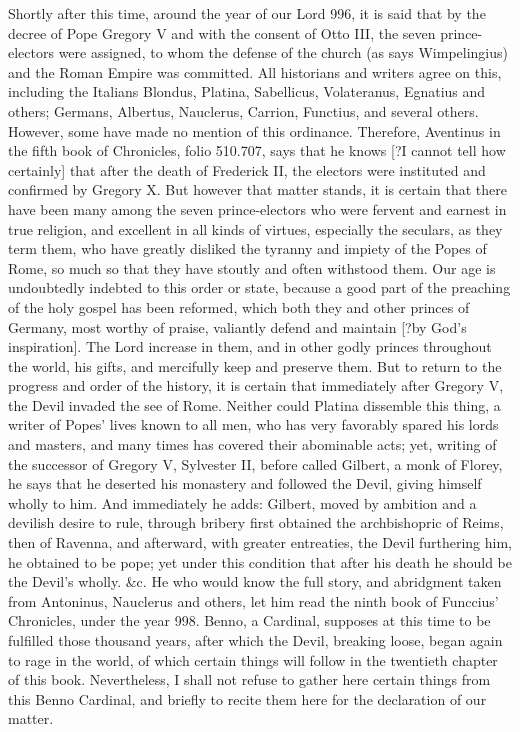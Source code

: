 Shortly after this time, around the year of our Lord 996, it is said that by the decree of Pope Gregory V and with the consent of Otto III, the seven prince-electors were assigned, to whom the defense of the church (as says Wimpelingius) and the Roman Empire was committed. All historians and writers agree on this, including the Italians Blondus, Platina, Sabellicus, Volateranus, Egnatius and others; Germans, Albertus, Nauclerus, Carrion, Functius, and several others. However, some have made no mention of this ordinance. Therefore, Aventinus in the fifth book of Chronicles, folio 510.707, says that he knows [?I cannot tell how certainly] that after the death of Frederick II, the electors were instituted and confirmed by Gregory X. But however that matter stands, it is certain that there have been many among the seven prince-electors who were fervent and earnest in true religion, and excellent in all kinds of virtues, especially the seculars, as they term them, who have greatly disliked the tyranny and impiety of the Popes of Rome, so much so that they have stoutly and often withstood them. Our age is undoubtedly indebted to this order or state, because a good part of the preaching of the holy gospel has been reformed, which both they and other princes of Germany, most worthy of praise, valiantly defend and maintain [?by God’s inspiration]. The Lord increase in them, and in other godly princes throughout the world, his gifts, and mercifully keep and preserve them. But to return to the progress and order of the history, it is certain that immediately after Gregory V, the Devil invaded the see of Rome. Neither could Platina dissemble this thing, a writer of Popes’ lives known to all men, who has very favorably spared his lords and masters, and many times has covered their abominable acts; yet, writing of the successor of Gregory V, Sylvester II, before called Gilbert, a monk of Florey, he says that he deserted his monastery and followed the Devil, giving himself wholly to him. And immediately he adds: Gilbert, moved by ambition and a devilish desire to rule, through bribery first obtained the archbishopric of Reims, then of Ravenna, and afterward, with greater entreaties, the Devil furthering him, he obtained to be pope; yet under this condition that after his death he should be the Devil’s wholly. \&c. He who would know the full story, and abridgment taken from Antoninus, Nauclerus and others, let him read the ninth book of Funccius’ Chronicles, under the year 998. Benno, a Cardinal, supposes at this time to be fulfilled those thousand years, after which the Devil, breaking loose, began again to rage in the world, of which certain things will follow in the twentieth chapter of this book. Nevertheless, I shall not refuse to gather here certain things from this Benno Cardinal, and briefly to recite them here for the declaration of our matter.

